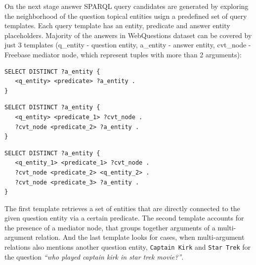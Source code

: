 On the next stage answer SPARQL query candidates are generated by exploring the neighborhood of the question topical entities usign a predefined set of query templates.
Each query template has an entity, predicate and answer entity placeholders.
Majority of the answers in WebQuestions dataset can be covered by just 3 templates (q\_entity - question entity, a\_entity - answer entity, cvt\_node - Freebase mediator node, which represent tuples with more than 2 arguments):

\begin{lstlisting}[frame=single]
SELECT DISTINCT ?a_entity {
   <q_entity> <predicate> ?a_entity .
}
\end{lstlisting}

\begin{lstlisting}[frame=single]
SELECT DISTINCT ?a_entity {
   <q_entity> <predicate_1> ?cvt_node .
   ?cvt_node <predicate_2> ?a_entity .
}
\end{lstlisting}

\begin{lstlisting}[frame=single]
SELECT DISTINCT ?a_entity {
   <q_entity_1> <predicate_1> ?cvt_node .
   ?cvt_node <predicate_2> <q_entity_2> .
   ?cvt_node <predicate_3> ?a_entity .
}
\end{lstlisting}

The first template retrieves a set of entities that are directly connected to the given question entity via a certain predicate.
The second template accounts for the presence of a mediator node, that groups together arguments of a multi-argument relation.
And the last template looks for cases, when multi-argument relations also mentions another question entity, \eg \texttt{Captain Kirk} and \texttt{Star Trek} for the question \textit{``who played captain kirk in star trek movie?''}.


